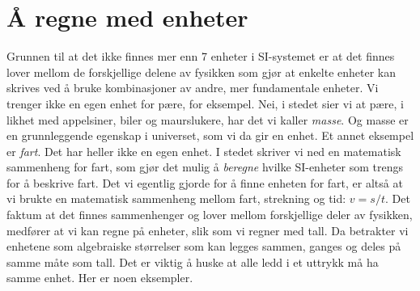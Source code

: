 \section{Å regne med enheter}
Grunnen til at det ikke finnes mer enn 7 enheter i SI-systemet er at det finnes lover mellom de forskjellige delene av fysikken som gjør at enkelte enheter kan skrives ved å bruke kombinasjoner av andre, mer fundamentale enheter. Vi trenger ikke en egen enhet for pære, for eksempel. Nei, i stedet sier vi at pære, i likhet med appelsiner, biler og maurslukere, har det vi kaller \textit{masse}. Og masse er en grunnleggende egenskap i universet, som vi da gir en enhet. Et annet eksempel er \textit{fart}. Det har heller ikke en egen enhet. I stedet skriver vi ned en matematisk sammenheng for fart, som gjør det mulig å \textit{beregne} hvilke SI-enheter som trengs for å beskrive fart. 
Det vi egentlig gjorde for å finne enheten for fart, er altså at vi brukte en matematisk sammenheng mellom fart, strekning og tid: $v=s/t$. Det faktum at det finnes sammenhenger og lover mellom forskjellige deler av fysikken, medfører at vi kan regne på enheter, slik som vi regner med tall. Da betrakter vi enhetene som algebraiske størrelser som kan legges sammen, ganges og deles på samme måte som tall. Det er viktig å huske at alle ledd i et uttrykk må ha samme enhet. Her er noen eksempler.


